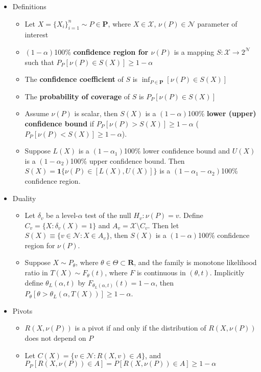 \documentclass[12pt,english]{article}
\begin{document}
\begin{itemize}
	\item Definitions
	\begin{itemize}
		\item Let $X = \{ X_{i} \}_{i=1}^{n} \sim P \in \mathbf{P}$, where $X \in \mathcal{X}$, $\nu(P) \in \mathcal{N}$ parameter of interest
		\item $(1 - \alpha)$100\% \textbf{confidence region for $\nu(P)$} is a mapping $S : \mathcal{X} \to 2^{\mathcal{N}}$ such that $P_{P}[\nu(P) \in S(X)] \geq 1 - \alpha$
		\item The \textbf{confidence coefficient} of $S$ is $\inf_{P \in \mathbf{P}}[\nu(P) \in S(X)]$
		\item The \textbf{probability of coverage} of $S$ is $P_{P}[\nu(P) \in S(X)]$
		\item Assume $\nu(P)$ is scalar, then $S(X)$ is a $(1 - \alpha)$100\% \textbf{lower (upper) confidence bound} if $P_{P}[\nu(P) > S(X)] \geq 1 - \alpha$ ($P_{P}[\nu(P) < S(X)] \geq 1 - \alpha$).
		\item Suppose $L(X)$ is a $(1 - \alpha_{1})$100\% lower confidence bound and $U(X)$ is a $(1 - \alpha_{2})$100\% upper confidence bound. Then $S(X) = \mathbf{1}\{ \nu(P) \in [L(X), U(X)] \}$ is a $(1 - \alpha_{1} - \alpha_{2})$100\% confidence region.
	\end{itemize}
	\item Duality
	\begin{itemize}
		\item Let $\delta_{v}$ be a level-$\alpha$ test of the null $H_{v} : \nu(P) = v$. Define $C_{v} = \{ X : \delta_{v}(X) = 1 \}$ and $A_{v} = \mathcal{X} \setminus C_{v}$. Then let $S(X) \equiv \{ v \in \mathcal{N} : X \in A_{v} \}$, then $S(X)$ is a $(1 - \alpha)$100\% confidence region for $\nu(P)$.
		\item Suppose $X \sim P_{\theta}$, where $\theta \in \Theta \subset \mathbf{R}$, and the family is monotone likelihood ratio in $T(X) \sim F_{\theta}(t)$, where $F$ is continuous in $(\theta, t)$. Implicitly define $\theta_{L}(\alpha, t)$ by $F_{\theta_{L}(\alpha, t)}(t) = 1 - \alpha$, then $P_{\theta}[\theta > \theta_{L}(\alpha, T(X))] \geq 1 - \alpha$.
	\end{itemize}
	\item Pivots
	\begin{itemize}
		\item $R(X, \nu(P))$ is a pivot if and only if the distribution of $R(X, \nu(P))$ does not depend on $P$
		\item Let $C(X) = \{ v \in \mathcal{N} : R(X, v) \in A \}$, and $P_{P}[R(X, \nu(P)) \in A] = P[R(X, \nu(P)) \in A] \geq 1 - \alpha$
	\end{itemize}
\end{itemize}
\end{document}
